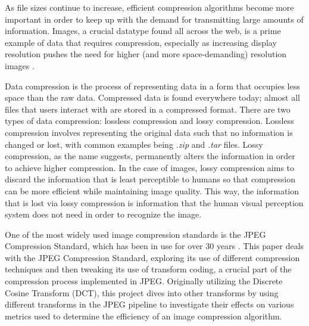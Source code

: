 As file sizes continue to increase, efficient compression algorithms become more important in order to keep up with the demand for transmitting large amounts of information. Images, a crucial datatype found all across the web, is a prime example of data that requires compression, especially as increasing display resolution pushes the need for higher (and more space-demanding) resolution images \cite{jayasankar_survey_2021}. 

Data compression is the process of representing data in a form that occupies less space than the raw data. Compressed data is found everywhere today; almost all files that users interact with are stored in a compressed format. There are two types of data compression: lossless compression and lossy compression. Lossless compression involves representing the original data such that no information is changed or lost, with common examples being \textit{.zip} and \textit{.tar} files. Lossy compression, as the name suggests, permanently alters the information in order to achieve higher compression. In the case of images, lossy compression aims to discard the information that is least perceptible to humans so that compression can be more efficient while maintaining image quality. This way, the information that is lost via lossy compression is information that the human visual perception system does not need in order to recognize the image.

One of the most widely used image compression standards is the JPEG Compression Standard, which has been in use for over 30 years \cite{wallace_jpeg_1992}. This paper deals with the JPEG Compression Standard, exploring its use of different compression techniques and then tweaking its use of transform coding, a crucial part of the compression process implemented in JPEG. Originally utilizing the Discrete Cosine Transform (DCT), this project dives into other transforms by using different transforms in the JPEG pipeline to investigate their effects on various metrics used to determine the efficiency of an image compression algorithm.
